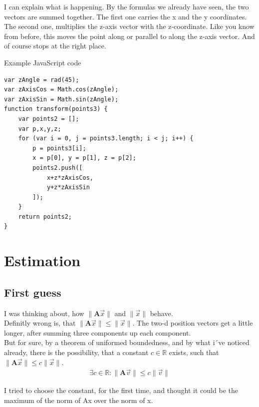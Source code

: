 \documentclass[a4paper]{article}
\begin{document}
I can explain what is happening. By the formulas we already have seen, the two vectors are summed together. The first one carries the x and the y coordinates. The second one, multiplies the z-axis vector with the z-coordinate. Like you know from before, this moves the point along or parallel to along the z-axis vector. And of course stops at the right place.


\begin{example}
Example JavaScript code
\begin{lstlisting}
var zAngle = rad(45);
var zAxisCos = Math.cos(zAngle);
var zAxisSin = Math.sin(zAngle);
function transform(points3) {
    var points2 = [];
    var p,x,y,z;
    for (var i = 0, j = points3.length; i < j; i++) {
        p = points3[i];
        x = p[0], y = p[1], z = p[2];
        points2.push([
            x+z*zAxisCos,
            y+z*zAxisSin
        ]);
    }
    return points2;
}
\end{lstlisting}
\end{example}

\section{Estimation}

\subsection{First guess}

I was thinking about, how $\|\boldsymbol{A}\vec{x}\|$ and $\|\vec{x}\|$ behave.\\

Definitly wrong is, that $\|\boldsymbol{A}\vec{x}\| \leq \|\vec{x}\|$. The two-d position vectors get a little longer, after summing three components up each component.\\ 

But for sure, by a theorem of uniformed boundedness, and by what i´ve noticed already,
there is the possibility, that a constant $c \in \mathbb{R}$ exists, such that $\|\boldsymbol{A}\vec{x}\| \leq c\|\vec{x}\|$.\\

\begin{displaymath}
\begin{align}
\exists c \in \mathbb{R}: \|\boldsymbol{A}\vec{v}\| \leq c\|\vec{v}\|
\end{align}
\end{displaymath}

I tried to choose the constant, for the first time, and thought it could be the maximum of the norm of Ax over the norm of x.
\end{document}
